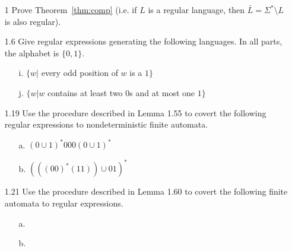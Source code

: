 \documentclass[]{book}
\theoremstyle{definition}
\begin{document}
\begin{enumerate}

\item[1] Prove Theorem~\ref{thm:comp} (i.e. if $L$ is a regular language, then $\bar{L} = \Sigma^* \setminus L$ is also regular).

\item[1.6] Give regular expressions generating the following languages. In all parts, the alphabet is $\{0,1\}$.

    \begin{enumerate}
        \item[i.] $\{w |$ every odd position of $w$ is a $1\}$
        
        \item[j.] $\{w | w $ contains at least two $0$s and at most one $1\}$

    \end{enumerate}

\item[1.19] Use the procedure described in Lemma 1.55 to covert the following regular expressions to nondeterministic finite automata.

    \begin{enumerate}
        \item[a.] $(0 \cup 1)^*000(0 \cup 1)^*$
        \item[b.] $(((00)^*(11)) \cup 01)^*$
    \end{enumerate}

\item[1.21] Use the procedure described in Lemma 1.60 to covert the following finite automata to regular expressions.

    \begin{enumerate}
        \item[a.] 
        

        \item[b.]
        


\end{enumerate}
\end{enumerate}
\end{document}
